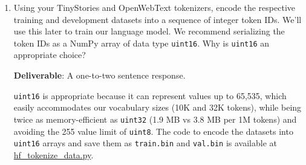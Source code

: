 \begin{enumerate}[label=(\alph*)]
    \item Using your TinyStories and OpenWebText tokenizers, encode the respective training and development datasets into a sequence of integer token IDs. We'll use this later to train our language model. We recommend serializing the token IDs as a NumPy array of data type \lstinline{uint16}. Why is \lstinline{uint16} an appropriate choice?

    \textbf{Deliverable}: A one-to-two sentence response.

    \begin{answer}
    \lstinline{uint16} is appropriate because it can represent values up to 65,535, which easily accommodates our vocabulary sizes (10K and 32K tokens), while being twice as memory-efficient as \lstinline{uint32} (1.9 MB vs 3.8 MB per 1M tokens) and avoiding the 255 value limit of \lstinline{uint8}. The code to encode the datasets into \lstinline{uint16} arrays and save them as \texttt{train.bin} and \texttt{val.bin} is available at \href{https://github.com/donglinkang2021/assignment1-basics/blob/main/data_utils/hf_tokenize_data.py}{hf\_tokenize\_data.py}.
    \end{answer}
\end{enumerate}